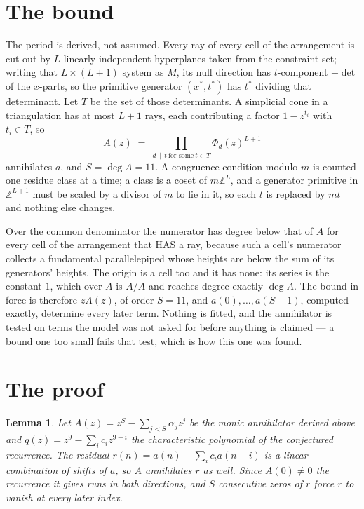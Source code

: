 \documentclass[11pt,a4paper]{article}
\theoremstyle{plain}
\newtheorem{lemma}[theorem]{Lemma}
\theoremstyle{definition}
\begin{document}
\section{The bound}

The period is derived, not assumed. Every ray of every cell of the arrangement is cut out by
$L$ linearly independent hyperplanes taken from the constraint set; writing that $L\times(L+1)$
system as $M$, its null direction has $t$-component $\pm\det$ of the $x$-parts, so the
primitive generator $(x^*,t^*)$ has $t^*$ dividing that determinant. Let $T$ be the set of
those determinants. A simplicial cone in a triangulation has at most $L+1$ rays, each
contributing a factor $1-z^{t_i}$ with $t_i\in T$, so
\[
A(z)\;=\;\prod_{d\,\mid\,t\ \text{for some}\ t\in T}\Phi_d(z)^{L+1}
\]
annihilates $a$, and $S=\deg A=11$. A congruence condition modulo $m$ is counted one residue
class at a time; a class is a coset of $m\mathbb{Z}^L$, and a generator primitive in
$\mathbb{Z}^{L+1}$ must be scaled by a divisor of $m$ to lie in it, so each $t$ is replaced
by $mt$ and nothing else changes.

Over the common denominator the numerator has degree below that of $A$ for every cell of the
arrangement that HAS a ray, because such a cell's numerator collects a fundamental
parallelepiped whose heights are below the sum of its generators' heights. The origin is a cell
too and it has none: its series is the constant $1$, which over $A$ is $A/A$ and reaches degree
exactly $\deg A$. The bound in force is therefore $zA(z)$, of order $S=11$, and
$a(0),\dots,a(S-1)$, computed exactly, determine every later term. Nothing is fitted, and the
annihilator is tested on terms the model was not asked for before anything is claimed --- a
bound one too small fails that test, which is how this one was found.

\section{The proof}

\begin{lemma}\label{lem:crit}
Let $A(z)=z^S-\sum_{j<S}\alpha_jz^{j}$ be the monic annihilator derived above and
$q(z)=z^{9}-\sum_ic_iz^{9-i}$ the characteristic polynomial of the conjectured
recurrence. The residual $r(n)=a(n)-\sum_ic_ia(n-i)$ is a linear combination of shifts of $a$,
so $A$ annihilates $r$ as well. Since $A(0)\ne0$ the recurrence it gives runs in both
directions, and $S$ consecutive zeros of $r$ force $r$ to vanish at every later index.
\end{lemma}
\end{document}
